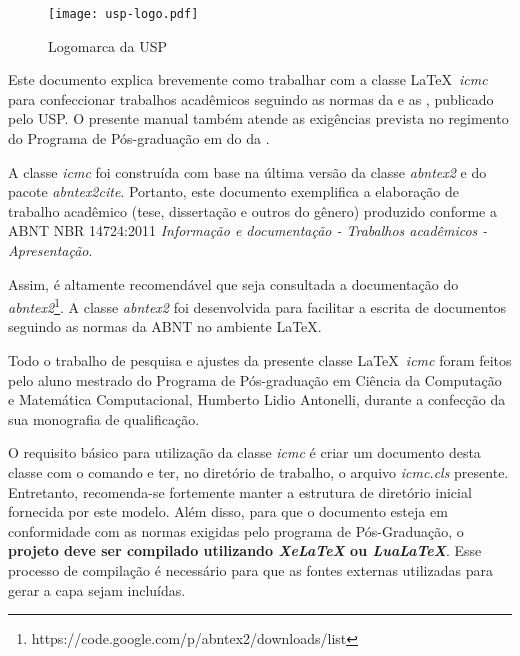 \begin{figure}[htb]
 \caption{Logomarca da USP}
 \label{fig:logomarca_usp_novo}
 \centering
 \texttt{[image: usp-logo.pdf]}
\end{figure}



Este documento explica brevemente como trabalhar com a classe \LaTeX~\textit{icmc} para confeccionar trabalhos acadêmicos seguindo as normas da  e as , publicado pelo  USP. O presente manual também atende as exigências prevista no regimento do Programa de Pós-graduação em  do  da .


A classe \textit{icmc} foi construída com base na última versão da classe \textit{abntex2} e do pacote \textit{abntex2cite}. Portanto, este documento exemplifica a elaboração de trabalho
acadêmico (tese, dissertação e outros do gênero) produzido conforme a ABNT NBR
14724:2011 \textit{Informação e documentação - Trabalhos acadêmicos - Apresentação}.

Assim, é altamente recomendável que seja consultada a documentação do \textit{abntex2}\footnote{https://code.google.com/p/abntex2/downloads/list}. A classe \textit{abntex2} foi desenvolvida para facilitar a escrita de documentos seguindo as normas da ABNT no ambiente \LaTeX\;\cite{frasson:2005:classe_abnt}.

Todo o trabalho de pesquisa e ajustes da presente classe \LaTeX~\emph{icmc} foram feitos pelo aluno mestrado do Programa de Pós-graduação em Ciência da Computação e Matemática Computacional, Humberto Lidio Antonelli, durante a confecção da sua monografia de qualificação.

O requisito básico para utilização da classe \textit{icmc} é criar um documento desta classe com o comando
 e ter, no diretório de trabalho, o arquivo \emph{icmc.cls} presente. Entretanto, recomenda-se fortemente manter a estrutura de diretório inicial fornecida por este modelo. Além disso, para que o documento esteja em conformidade com as normas exigidas pelo programa de Pós-Graduação, o \textbf{projeto deve ser compilado utilizando \textit{XeLaTeX} ou \textit{LuaLaTeX}}. Esse processo de compilação é necessário para que as fontes externas utilizadas para gerar a capa sejam incluídas.

